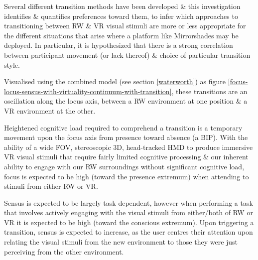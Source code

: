 \documentclass[conference]{acmsiggraph}
\begin{document}
Several different transition methods have been developed \& this investigation identifies \& quantifies preferences toward them, to infer which approaches to transitioning between RW \& VR visual stimuli are more or less appropriate for the different situations that arise where a platform like Mirrorshades may be deployed. In particular, it is hypothesized that there is a strong correlation between participant movement (or lack thereof) \& choice of particular transition style.

Visualised using the combined model (see section \ref{waterworth}) as figure \ref{focus-locus-sensus-with-virtuality-continuum-with-transition}, these transitions are an oscillation along the locus axis, between a RW environment at one position \& a VR environment at the other.

Heightened cognitive load required to comprehend a transition is a temporary movement upon the focus axis from presence toward absence (a BIP). With the ability of a wide FOV, stereoscopic 3D, head-tracked HMD to produce immersive VR visual stimuli that require fairly limited cognitive processing \& our inherent ability to engage with our RW surroundings without significant cognitive load, focus is expected to be high (toward the presence extremum) when attending to stimuli from either RW or VR.

Sensus is expected to be largely task dependent, however when performing a task that involves actively engaging with the visual stimuli from either/both of RW or VR it is expected to be high (toward the conscious extremum). Upon triggering a transition, sensus is expected to increase, as the user centres their attention upon relating the visual stimuli from the new environment to those they were just perceiving from the other environment.
\end{document}

